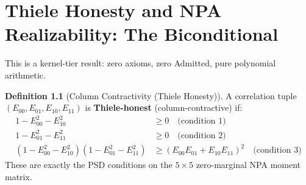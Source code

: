 \documentclass[11pt, a4paper]{report}
\theoremstyle{definition}
\newtheorem{definition}{Definition}[chapter]
\theoremstyle{plain}
\begin{document}
\chapter{Thiele Honesty and NPA Realizability: The Biconditional}

This is a kernel-tier result: zero axioms, zero Admitted, pure polynomial arithmetic.

\begin{definition}[Column Contractivity (Thiele Honesty)]
A correlation tuple $(E_{00}, E_{01}, E_{10}, E_{11})$ is \textbf{Thiele-honest} (column-contractive) if:
\begin{align}
1 - E_{00}^2 - E_{10}^2 &\geq 0 \quad \text{(condition 1)} \\
1 - E_{01}^2 - E_{11}^2 &\geq 0 \quad \text{(condition 2)} \\
(1-E_{00}^2-E_{10}^2)(1-E_{01}^2-E_{11}^2) &\geq (E_{00}E_{01}+E_{10}E_{11})^2 \quad \text{(condition 3)}
\end{align}
These are exactly the PSD conditions on the $5 \times 5$ zero-marginal NPA moment matrix.
\end{definition}
\end{document}
